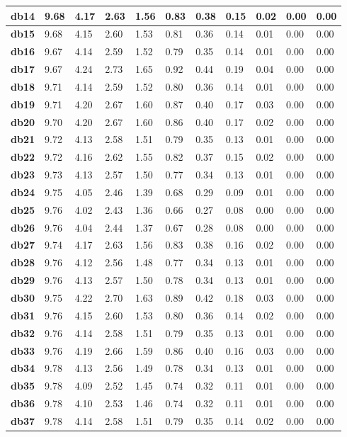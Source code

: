 \begin{tiny}
\begin{longtable}{|l|l|l|l|l|l|l|l|l|l|l|}
\textbf{db14}&9.68&4.17&2.63&1.56&0.83&0.38&0.15&0.02&0.00&0.00\\\hline
\textbf{db15}&9.68&4.15&2.60&1.53&0.81&0.36&0.14&0.01&0.00&0.00\\\hline
\textbf{db16}&9.67&4.14&2.59&1.52&0.79&0.35&0.14&0.01&0.00&0.00\\\hline
\textbf{db17}&9.67&4.24&2.73&1.65&0.92&0.44&0.19&0.04&0.00&0.00\\\hline
\textbf{db18}&9.71&4.14&2.59&1.52&0.80&0.36&0.14&0.01&0.00&0.00\\\hline
\textbf{db19}&9.71&4.20&2.67&1.60&0.87&0.40&0.17&0.03&0.00&0.00\\\hline
\textbf{db20}&9.70&4.20&2.67&1.60&0.86&0.40&0.17&0.02&0.00&0.00\\\hline
\textbf{db21}&9.72&4.13&2.58&1.51&0.79&0.35&0.13&0.01&0.00&0.00\\\hline
\textbf{db22}&9.72&4.16&2.62&1.55&0.82&0.37&0.15&0.02&0.00&0.00\\\hline
\textbf{db23}&9.73&4.13&2.57&1.50&0.77&0.34&0.13&0.01&0.00&0.00\\\hline
\textbf{db24}&9.75&4.05&2.46&1.39&0.68&0.29&0.09&0.01&0.00&0.00\\\hline
\textbf{db25}&9.76&4.02&2.43&1.36&0.66&0.27&0.08&0.00&0.00&0.00\\\hline
\textbf{db26}&9.76&4.04&2.44&1.37&0.67&0.28&0.08&0.00&0.00&0.00\\\hline
\textbf{db27}&9.74&4.17&2.63&1.56&0.83&0.38&0.16&0.02&0.00&0.00\\\hline
\textbf{db28}&9.76&4.12&2.56&1.48&0.77&0.34&0.13&0.01&0.00&0.00\\\hline
\textbf{db29}&9.76&4.13&2.57&1.50&0.78&0.34&0.13&0.01&0.00&0.00\\\hline
\textbf{db30}&9.75&4.22&2.70&1.63&0.89&0.42&0.18&0.03&0.00&0.00\\\hline
\textbf{db31}&9.76&4.15&2.60&1.53&0.80&0.36&0.14&0.02&0.00&0.00\\\hline
\textbf{db32}&9.76&4.14&2.58&1.51&0.79&0.35&0.13&0.01&0.00&0.00\\\hline
\textbf{db33}&9.76&4.19&2.66&1.59&0.86&0.40&0.16&0.03&0.00&0.00\\\hline
\textbf{db34}&9.78&4.13&2.56&1.49&0.78&0.34&0.13&0.01&0.00&0.00\\\hline
\textbf{db35}&9.78&4.09&2.52&1.45&0.74&0.32&0.11&0.01&0.00&0.00\\\hline
\textbf{db36}&9.78&4.10&2.53&1.46&0.74&0.32&0.11&0.01&0.00&0.00\\\hline
\textbf{db37}&9.78&4.14&2.58&1.51&0.79&0.35&0.14&0.02&0.00&0.00\\\hline

\end{longtable}
\end{tiny}
